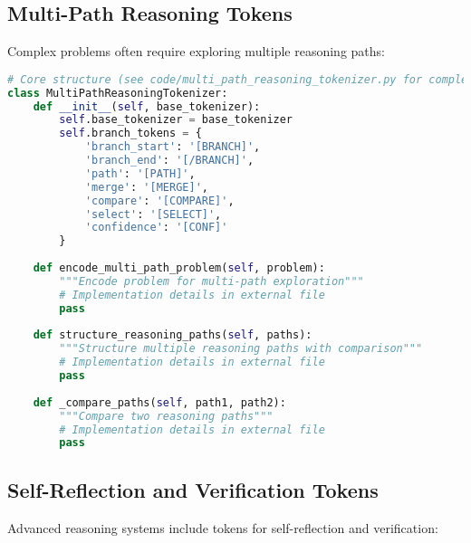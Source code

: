 \subsection{Multi-Path Reasoning Tokens}

Complex problems often require exploring multiple reasoning paths:

\begin{lstlisting}[language=Python, caption=Multi-path reasoning with branch tokens]
# Core structure (see code/multi_path_reasoning_tokenizer.py for complete implementation)
class MultiPathReasoningTokenizer:
    def __init__(self, base_tokenizer):
        self.base_tokenizer = base_tokenizer
        self.branch_tokens = {
            'branch_start': '[BRANCH]',
            'branch_end': '[/BRANCH]',
            'path': '[PATH]',
            'merge': '[MERGE]',
            'compare': '[COMPARE]',
            'select': '[SELECT]',
            'confidence': '[CONF]'
        }
        
    def encode_multi_path_problem(self, problem):
        """Encode problem for multi-path exploration"""
        # Implementation details in external file
        pass
    
    def structure_reasoning_paths(self, paths):
        """Structure multiple reasoning paths with comparison"""
        # Implementation details in external file
        pass
    
    def _compare_paths(self, path1, path2):
        """Compare two reasoning paths"""
        # Implementation details in external file
        pass
\end{lstlisting}

\subsection{Self-Reflection and Verification Tokens}

Advanced reasoning systems include tokens for self-reflection and verification:

